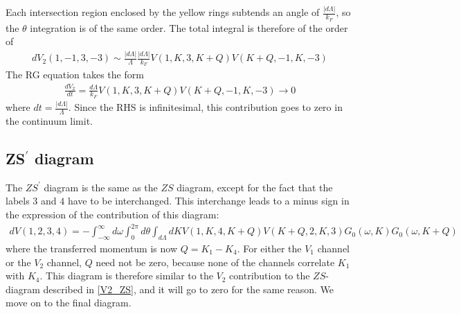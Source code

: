 \documentclass{article}
\begin{document}
Each intersection region enclosed by the yellow rings subtends an angle of \(\frac{|d\Lambda|}{k_F}\), so the \(\theta\) integration is of the same order. The total integral is therefore of the order of
\begin{equation}\begin{aligned}
	dV_2(1,-1,3,-3) \sim \frac{|d\Lambda|}{\Lambda}\frac{|d\Lambda|}{k_F} V(1,K,3,K+Q) V(K+Q, -1, K, -3)
\end{aligned}\end{equation}
The RG equation takes the form
\begin{equation}\begin{aligned}
	\frac{d V_2}{dt} = \frac{d\Lambda}{k_F} V(1,K,3,K+Q) V(K+Q, -1, K, -3) \to 0
\end{aligned}\end{equation}
where \(dt = \frac{|d\Lambda|}{\Lambda}\). Since the RHS is infinitesimal, this contribution goes to zero in the continuum limit.
\subsection{ZS\(^\prime\) diagram}
The \(ZS^\prime\) diagram is the same as the \(ZS\) diagram, except for the fact that the labels \(3\) and \(4\) have to be interchanged. This interchange leads to a minus sign in the expression of the contribution of this diagram:
\begin{equation}\begin{aligned}
	dV(1,2,3,4) = -\int_{-\infty}^\infty d\omega  \int_0^{2\pi} d\theta \int_{d\Lambda}dK V(1,K,4,K+Q) V(K+Q, 2, K, 3) G_0(\omega, K)G_0(\omega, K+Q)
\end{aligned}\end{equation}
where the transferred momentum is now \(Q=K_1 - K_4\). For either the \(V_1\) channel or the \(V_2\) channel, \(Q\) need not be zero, because none of the channels correlate \(K_1\) with \(K_4\). This diagram is therefore similar to the \(V_2\) contribution to the \(ZS\)-diagram described in \ref{V2_ZS}, and it will go to zero for the same reason. We move on to the final diagram.
\end{document}
